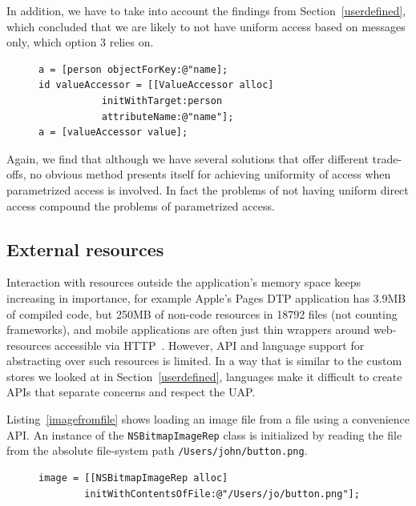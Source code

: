 \documentclass[preprint]{sigplanconf}
\begin{document}
In addition, we have to take into account the findings from
Section~\ref{userdefined}, which concluded that we are likely to not have uniform access based on
messages only, which option 3 relies on.  

\begin{figure}[htbp]
\begin{lstlisting}[style=numbers,label=valueaccessoruse,caption=Keyed access vs. using a ValueAccessor]
a = [person objectForKey:@"name];
id valueAccessor = [[ValueAccessor alloc]
           initWithTarget:person 
           attributeName:@"name"];
a = [valueAccessor value];
\end{lstlisting}
\end{figure}

Again, we find that although we have several solutions that offer different trade-offs, no obvious
method presents itself for achieving uniformity of access when parametrized access is involved.
In fact the problems of not having uniform direct access compound the problems of parametrized access.


\subsection{External resources}

Interaction with resources outside the application's memory space keeps increasing
in importance,
for example Apple's Pages DTP application has 3.9MB of compiled code,
but 250MB of non-code resources in 18792 files (not counting frameworks), and
mobile applications are often just thin wrappers around web-resources accessible
via HTTP~\cite{http}.  However, API and language support
for abstracting over such resources is limited.  In a way that is similar to the custom stores we looked at in Section~\ref{userdefined}, languages make it difficult to create APIs that separate concerns
and respect the UAP.

Listing~\ref{imagefromfile} shows loading an image file from a file using a convenience
API.   An instance of the {\tt NSBitmapImageRep} class is initialized by reading the file
from the absolute file-system path {\tt /Users/john/button.png}.

\begin{figure}[htbp]
\begin{lstlisting}[style=numbers,label=imagefromfile,caption=Accessing an image from the file system]
image = [[NSBitmapImageRep alloc] 
        initWithContentsOfFile:@"/Users/jo/button.png"];
\end{lstlisting}
\end{figure}
\end{document}

